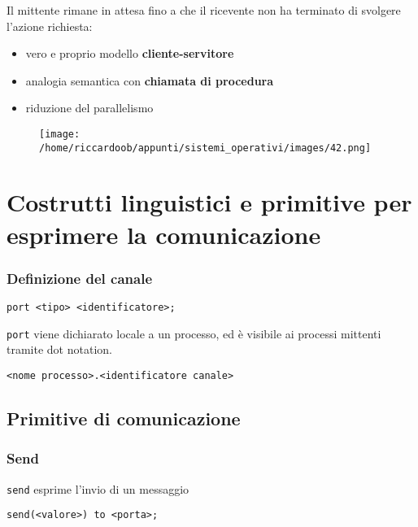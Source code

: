 Il mittente rimane in attesa fino a che il ricevente non ha terminato di svolgere l'azione richiesta:
\begin{itemize}
    \item vero e proprio modello \textbf{cliente-servitore}
    \item analogia semantica con \textbf{chiamata di procedura}
    \item riduzione del parallelismo
\end{itemize}

\begin{figure}[H]
    \centering
    \texttt{[image: /home/riccardoob/appunti/sistemi\_operativi/images/42.png]}
\end{figure}

\section{Costrutti linguistici e primitive per esprimere la comunicazione}


\subsubsection{Definizione del canale}

\begin{verbatim}
port <tipo> <identificatore>;
\end{verbatim}

\texttt{port} viene dichiarato locale a un processo, ed è visibile ai processi mittenti tramite dot notation.
\begin{verbatim}
<nome processo>.<identificatore canale>
\end{verbatim}

\subsection{Primitive di comunicazione}

\subsubsection{Send}

\texttt{send} esprime l'invio di un messaggio
\begin{verbatim}
send(<valore>) to <porta>;
\end{verbatim}

